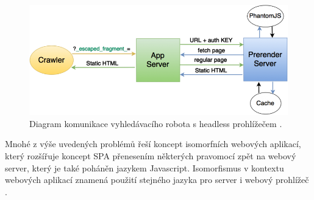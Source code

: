 \begin{figure}[h]
\begin{centering}
\includegraphics[scale=0.4]{obrazky/prerender}
\par\end{centering}
\caption{Diagram komunikace vyhledávacího robota s headless prohlížečem \cite{crawler_spa}. \label{fig:prerender}}
\end{figure}
\FloatBarrier

Mnohé z výše uvedených problémů řeší koncept isomorfních webových aplikací, který rozšířuje koncept SPA přenesením některých pravomocí zpět na webový server, který je také poháněn jazykem Javascript. Isomorfismus v kontextu webových aplikací znamená použití stejného jazyka pro server i webový prohlížeč \cite{universal_js}.